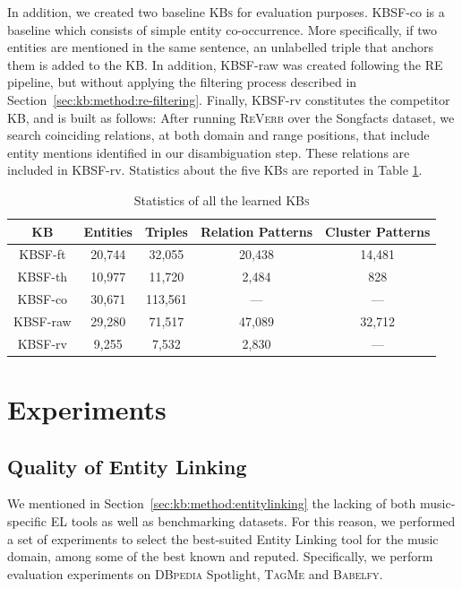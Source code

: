 In addition, we created two baseline \textsc{KBs} for evaluation purposes. \textsc{KBSF}-co is a baseline which consists of simple entity co-occurrence. More specifically, if two entities are mentioned in the same sentence, an unlabelled triple that anchors them is added to the KB. In addition, \textsc{KBSF}-raw was created following the \textsc{RE} pipeline, but without applying the filtering process described in Section~\ref{sec:kb:method:re-filtering}. Finally, \textsc{KBSF}-rv constitutes the competitor \textsc{KB}, and is built as follows: After running \textsc{ReVerb} over the Songfacts dataset, we search coinciding relations, at both domain and range positions, that include entity mentions identified in our disambiguation step. These relations are included in KBSF-rv. Statistics about the five \textsc{KBs} are reported in Table \ref{tab:kbs}.

\begin{table}[ht!]
\scriptsize
\centering
	\begin{tabular}{ | c | c | c | c | c | }
	\hline
	\textbf{KB} & \textbf{Entities} & \textbf{Triples} & \textbf{Relation Patterns} & \textbf{Cluster Patterns} \\
	\hline
	\textsc{KBSF}-ft & 20,744 & 32,055 & 20,438 & 14,481 \\
	\textsc{KBSF}-th & 10,977 & 11,720 & 2,484 & 828 \\
	\hline
	\textsc{KBSF}-co & 30,671 & 113,561 & --- & --- \\
	\textsc{KBSF}-raw & 29,280 & 71,517 & 47,089 & 32,712 \\
	\hline
	\textsc{KBSF}-rv & 9,255 & 7,532 & 2,830 & --- \\
	\hline
	\end{tabular}
	\caption{Statistics of all the learned \textsc{KBs}}
	\label{tab:kbs}
\end{table}


\section{Experiments}
\label{sec:kb:experiments}

\subsection{Quality of Entity Linking}
\label{sec:kb:experiments:qualityentitylinking}

We mentioned in Section~\ref{sec:kb:method:entitylinking} the lacking of both music-specific \textsc{EL} tools as well as benchmarking datasets. For this reason, we performed a set of experiments to select the best-suited Entity Linking tool for the music domain, among some of the best known and reputed. Specifically, we perform evaluation experiments on \textsc{DBpedia} Spotlight, \textsc{TagMe} and \textsc{Babelfy}. 

